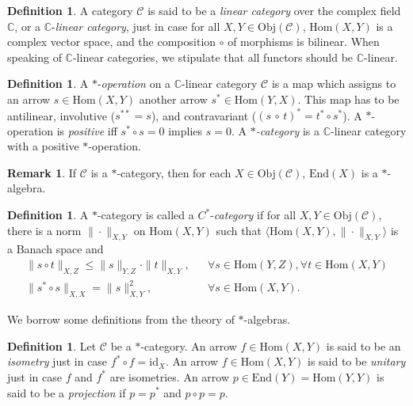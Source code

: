 \documentclass[11pt]{article}
\newcommand{\norm}[1]{\| #1\|}
\theoremstyle{definition}
\theoremstyle{definition}
\newtheorem{defn}[thm]{Definition}
\newtheorem{note}[thm]{Remark}
\theoremstyle{remark}
\newcommand{\Obj}{\mathrm{Obj}}
\def\2#1{{\mathcal #1}}
\def\7#1{{\mathbb #1}}
\newcommand{\Hom}{\mathrm{Hom}}
\newcommand{\End}{\mathrm{End}}
\newcommand{\mcirc}{\circ}
\def\id{\mathrm{id}}
\begin{document}
\begin{defn} A category $\2C$ is said to be a \emph{linear category} over the complex
  field $\mathbb{C}$, or a $\7C$-\emph{linear category}, just in case for all $X,Y\in
  \Obj (\2C )$, $\Hom (X,Y)$ is a complex vector space, and the composition $\circ$
  of morphisms is bilinear.  When speaking of $\7C$-linear categories, we stipulate
  that all functors should be $\mathbb{C}$-linear.
\end{defn}

\begin{defn} A $*$-\emph{operation} on a $\7C$-linear category $\2C$ is a map which
  assigns to an arrow $s\in\Hom(X,Y)$ another arrow $s^*\in\Hom(Y,X)$.  This map has
  to be antilinear, involutive ($s^{**}=s$), and contravariant ($(s\,\circ\,
  t)^*=t^*\mcirc s^*$).  A $*$-operation is \emph{positive} iff $s^*\mcirc s=0$
  implies $s=0$. A \emph{$*$-category} is a $\7C$-linear category with a positive
  $*$-operation. \end{defn}

\begin{note} If $\2C$ is a $*$-category, then for each $X\in \Obj (\2C )$, $\End (X)$
  is a $*$-algebra.  \end{note}

\begin{defn} A $*$-category is called a $C^*$-\emph{category} if for all $X,Y\in \Obj
  (\2C )$, there is a norm $\norm{\cdot }_{X,Y}$ on $\Hom (X,Y)$ such that $\langle
  \Hom (X,Y),\norm{\cdot }_{X,Y}\rangle$ is a Banach space and \[ \begin{array}{lll}
    \norm{s\circ t}_{X,Z} \leq \norm{s}_{Y,Z}\cdot \norm{t}_{X,Y}, & & \forall s\in
    \Hom (Y,Z) ,\forall t\in
    \Hom (X,Y) \\
    \norm{s^*\circ s}_{X,X}=\norm{s}_{X,Y}^2 ,& & \forall s\in \Hom (X,Y)
    .\end{array} \]
\end{defn} 

We borrow some definitions from the theory of $*$-algebras.

\begin{defn} Let $\2C$ be a $*$-category.  An arrow
  $f\in \Hom (X,Y)$ is said to be an \emph{isometry}
  just in case $f^*\circ f=\id _X$.  An arrow $f\in
  \Hom (X,Y)$ is said to be \emph{unitary} just in case
  $f$ and $f^*$ are isometries.  An arrow $p\in
  \End (Y)=\Hom (Y,Y)$ is said to be a \emph{projection} if $p=p^*$ and $p\circ p=p$.
\end{defn}
\end{document}
